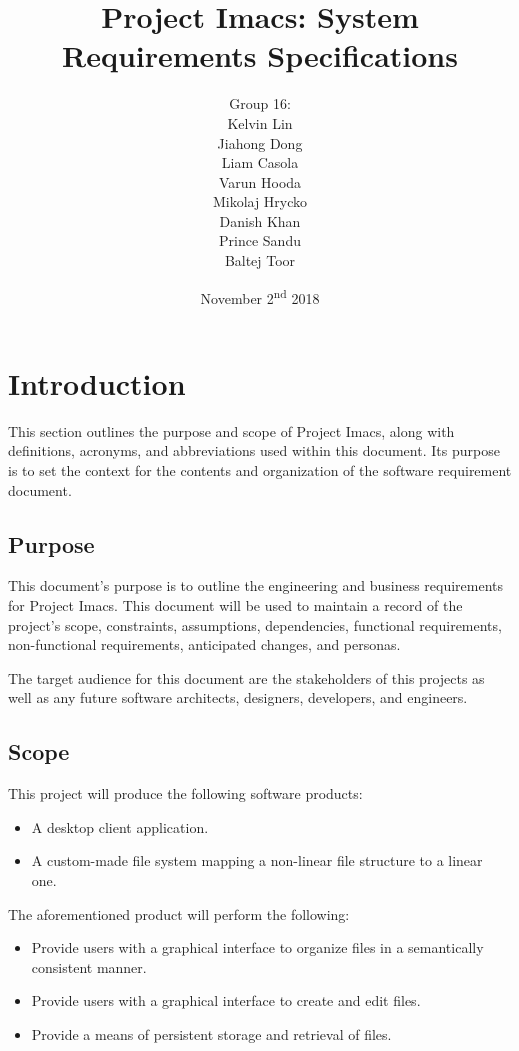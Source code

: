 \documentclass{article}
\title{Project Imacs: System Requirements Specifications}
\author{Group 16:\\ Kelvin Lin\\ Jiahong Dong\\ Liam Casola\\ Varun Hooda\\ Mikolaj Hrycko\\ Danish Khan\\ Prince Sandu\\ Baltej Toor }
\date{November 2\textsuperscript{nd} 2018}
\begin{document}
\maketitle
\newpage
\tableofcontents
\newpage
\section{Introduction}
This section outlines the purpose and scope of Project Imacs, along with definitions, acronyms, and abbreviations used within this document. Its purpose is to set the context for the contents and organization of the software requirement document.

\subsection{Purpose}
This document's purpose is to outline the engineering and business requirements for Project Imacs. This document will be used to maintain a record of the project's scope, constraints, assumptions, dependencies, functional requirements, non-functional requirements, anticipated changes, and personas.

The target audience for this document are the stakeholders of this projects as well as any future software architects, designers, developers, and engineers.

\subsection{Scope}
This project will produce the following software products:

\begin{itemize}
\item A desktop client application.
\item A custom-made file system mapping a non-linear file structure to a linear one.
\end{itemize}

The aforementioned product will perform the following:

\begin{itemize}
\item Provide users with a graphical interface to organize files in a semantically consistent manner.
\item Provide users with a graphical interface to create and edit files.
\item Provide a means of persistent storage and retrieval of files.
\end{itemize}
\end{document}
